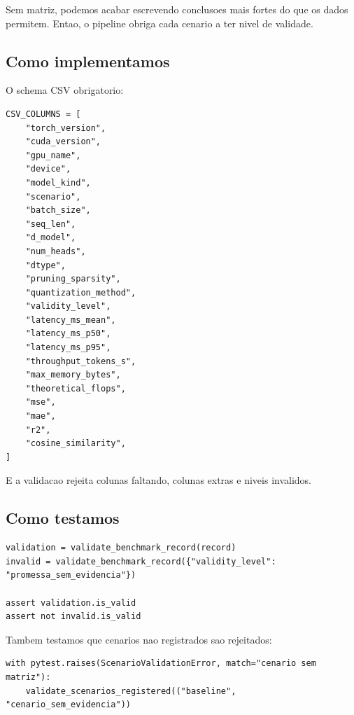 Sem matriz, podemos acabar escrevendo conclusoes mais fortes do que os dados permitem. Entao, o pipeline obriga cada cenario a ter nivel de validade.



\subsection{Como implementamos}



O schema CSV obrigatorio:



\begin{Verbatim}[fontsize=\small,breaklines=true,label=python]
CSV_COLUMNS = [
    "torch_version",
    "cuda_version",
    "gpu_name",
    "device",
    "model_kind",
    "scenario",
    "batch_size",
    "seq_len",
    "d_model",
    "num_heads",
    "dtype",
    "pruning_sparsity",
    "quantization_method",
    "validity_level",
    "latency_ms_mean",
    "latency_ms_p50",
    "latency_ms_p95",
    "throughput_tokens_s",
    "max_memory_bytes",
    "theoretical_flops",
    "mse",
    "mae",
    "r2",
    "cosine_similarity",
]
\end{Verbatim}



E a validacao rejeita colunas faltando, colunas extras e niveis invalidos.



\subsection{Como testamos}



\begin{Verbatim}[fontsize=\small,breaklines=true,label=python]
validation = validate_benchmark_record(record)
invalid = validate_benchmark_record({"validity_level": "promessa_sem_evidencia"})

assert validation.is_valid
assert not invalid.is_valid
\end{Verbatim}



Tambem testamos que cenarios nao registrados sao rejeitados:



\begin{Verbatim}[fontsize=\small,breaklines=true,label=python]
with pytest.raises(ScenarioValidationError, match="cenario sem matriz"):
    validate_scenarios_registered(("baseline", "cenario_sem_evidencia"))
\end{Verbatim}



